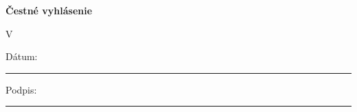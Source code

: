 \thispagestyle{empty} %

\vspace*{\fill}   

\noindent\LARGE\textbf{Čestné vyhlásenie}\\

\normalsize

{
	\setlength{\parindent}{0pt}
	\cestnevyhlasenie
}

\vspace{1.0cm}

\noindent V \nazovmestacestnevyhlasenie

\vspace{1.0cm}

Dátum: \rule{5cm}{0.4pt} \hfill Podpis: \rule{5cm}{0.4pt}

\newpage